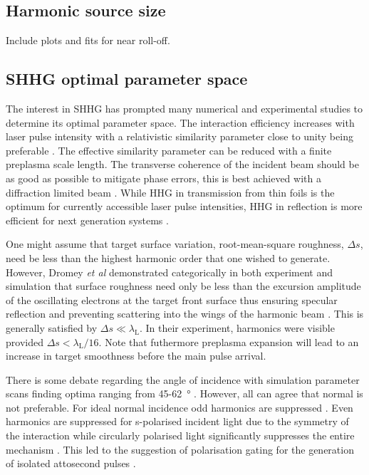 \subsection{Harmonic source size}
Include plots and fits for near roll-off.

\subsection{SHHG optimal parameter space}
The interest in SHHG has prompted many numerical and experimental studies to determine its optimal parameter space. The interaction efficiency increases with laser pulse intensity \cite{pukhovRelativisticHighHarmonics2009, edwardsXRayEmissionEffectiveness2020} with a relativistic similarity parameter close to unity being preferable \cite{edwardsXRayEmissionEffectiveness2020, gonoskovUltrarelativisticNanoplasmonicsRoute2011}. The effective similarity parameter can be reduced with a finite preplasma scale length. The transverse coherence of the incident beam should be as good as possible to mitigate phase errors, this is best achieved with a diffraction limited beam \cite{dromeyHighHarmonicGeneration2006}. While HHG in transmission from thin foils is the optimum for currently accessible laser pulse intensities, HHG in reflection is more efficient for next generation systems \cite{edwardsElectronNanobunchWidthDominatedSpectralPower2020}. 

One might assume that target surface variation, root-mean-square roughness, $\Delta s$, need be less than the highest harmonic order that one wished to generate. However, Dromey \textit{et al} demonstrated categorically in both experiment and simulation that surface roughness need only be less than the excursion amplitude of the oscillating electrons at the target front surface thus ensuring specular reflection and preventing scattering into the wings of the harmonic beam \cite{dromeyDiffractionlimitedPerformanceFocusing2009}. This is generally satisfied by $\Delta s \ll \lambda_\mathrm{L}$. In their experiment, harmonics were visible provided $\Delta s < \lambda_\mathrm{L}/16$. Note that futhermore preplasma expansion will lead to an increase in target smoothness before the main pulse arrival. 

There is some debate regarding the angle of incidence with simulation parameter scans finding optima ranging from 45-\qty{62}{\degree} \cite{edwardsXRayEmissionEffectiveness2020, thauryHighorderHarmonicAttosecond2010, gonoskovUltrarelativisticNanoplasmonicsRoute2011}. However, all can agree that normal is not preferable. For ideal normal incidence odd harmonics are suppressed \cite{lichtersShortpulseLaserHarmonics1996}. Even harmonics are suppressed for s-polarised incident light due to the symmetry of the interaction \cite{dollarEnhancedLaserAbsorption2017} while circularly polarised light significantly suppresses the entire mechanism \cite{savinAttosecondscaleAbsorptionExtreme2017}. This led to the suggestion of polarisation gating for the generation of isolated attosecond pulses \cite{yeungDependenceLaserDrivenCoherent2014}. 

